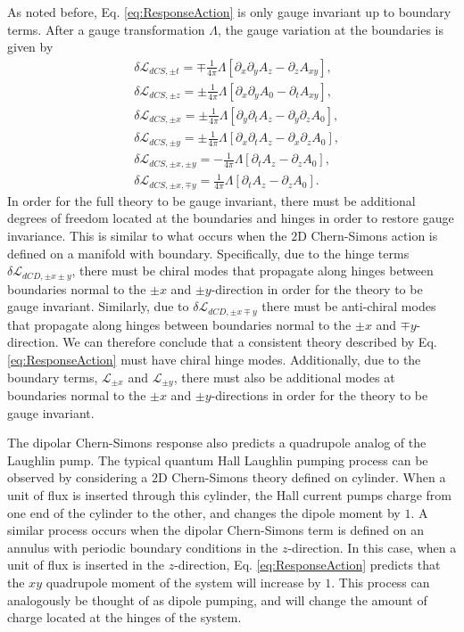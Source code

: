 \documentclass[prb,aps,twocolumn,groupaddress,floatfix]{revtex4-1}
\begin{document}
As noted before, Eq. \ref{eq:ResponseAction} is only gauge invariant up to boundary terms. After a gauge transformation $\Lambda$, the gauge variation at the boundaries is given by
\begin{equation}
\begin{split}
&\delta\mathcal{L}_{dCS,\pm t}= \mp\frac{1}{4\pi} \Lambda [\partial_x \partial_y A_{z}-\partial_z A_{xy}],\\
&\delta \mathcal{L}_{dCS,\pm z}= \pm\frac{1}{4\pi} \Lambda[\partial_x \partial_y A_0 - \partial_t A_{xy}],\\
&\delta \mathcal{L}_{dCS,\pm x}= \pm\frac{1}{4\pi} \Lambda[\partial_y \partial_t A_z - \partial_y \partial_z A_0 ],\\&\delta \mathcal{L}_{dCS,\pm y}= \pm\frac{1}{4\pi} \Lambda[\partial_x \partial_t A_z - \partial_x \partial_z A_0 ],\\
&\delta\mathcal{L}_{dCS,\pm x,\pm y} = -\frac{1}{4\pi} \Lambda [\partial_t A_z - \partial_z A_0],\\&
\delta \mathcal{L}_{dCS,\pm x,\mp y} = \frac{1}{4\pi}  \Lambda [\partial_t A_z - \partial_z A_0].
\end{split}
\label{eq:BoundGaugeVariation}\end{equation}
In order for the full theory to be gauge invariant, there must be additional degrees of freedom located at the boundaries and hinges in order to restore gauge invariance. This is similar to what occurs when the $2$D Chern-Simons action is defined on a manifold with boundary. Specifically, due to the hinge terms $\delta \mathcal{L}_{dCD,\pm x \pm y}$, there must be chiral modes that propagate along hinges between boundaries normal to the $\pm x$ and $\pm y$-direction in order for the theory to be gauge invariant. Similarly, due to $\delta\mathcal{L}_{dCD,\pm x \mp y}$   there must be anti-chiral modes that propagate along hinges between boundaries normal to the $\pm x$ and $\mp y$-direction.
We can therefore conclude that a consistent theory described by Eq. \ref{eq:ResponseAction} must have chiral hinge modes. Additionally, due to the boundary terms, $\mathcal{L}_{\pm x}$ and $\mathcal{L}_{\pm y}$, there must also be additional modes at boundaries normal to the $\pm x$ and $\pm y$-directions in order for the theory to be gauge invariant.
 
The dipolar Chern-Simons response also predicts a quadrupole analog of the Laughlin pump. The typical quantum Hall Laughlin pumping process can be observed by considering a $2$D Chern-Simons theory defined on cylinder. When a unit of flux is inserted through this cylinder, the Hall current pumps charge from one end of the cylinder to the other, and changes the dipole moment by $1$. A similar process occurs when the dipolar Chern-Simons term is defined on an annulus with periodic boundary conditions in the $z$-direction. In this case, when a unit of flux is inserted in the $z$-direction, Eq. \ref{eq:ResponseAction} predicts that the $xy$ quadrupole moment of the system will increase by $1$. This process can analogously be thought of as dipole pumping, and will change the amount of charge located at the hinges of the system. 
\end{document}
